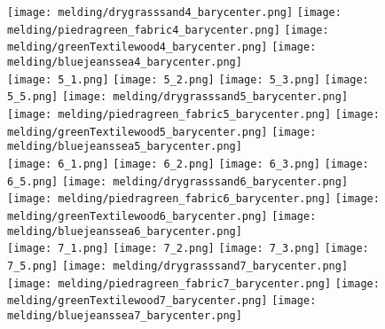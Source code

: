 \begin{figure}[ht!]
{    \hspace{2mm}
    \texttt{[image: melding/drygrasssand4\_barycenter.png]}
    \texttt{[image: melding/piedragreen\_fabric4\_barycenter.png]}
    \texttt{[image: melding/greenTextilewood4\_barycenter.png]}
    \texttt{[image: melding/bluejeanssea4\_barycenter.png]}
 \\
\vspace{1mm}
    \texttt{[image: 5\_1.png]}
    \texttt{[image: 5\_2.png]}
    \texttt{[image: 5\_3.png]}
    \texttt{[image: 5\_5.png]}
    \hspace{2mm}
    \texttt{[image: melding/drygrasssand5\_barycenter.png]}
    \texttt{[image: melding/piedragreen\_fabric5\_barycenter.png]}
    \texttt{[image: melding/greenTextilewood5\_barycenter.png]}
    \texttt{[image: melding/bluejeanssea5\_barycenter.png]}
 \\
\vspace{1mm}
    \texttt{[image: 6\_1.png]}
    \texttt{[image: 6\_2.png]}
    \texttt{[image: 6\_3.png]}
    \texttt{[image: 6\_5.png]}
    \hspace{2mm}
    \texttt{[image: melding/drygrasssand6\_barycenter.png]}
    \texttt{[image: melding/piedragreen\_fabric6\_barycenter.png]}
    \texttt{[image: melding/greenTextilewood6\_barycenter.png]}
    \texttt{[image: melding/bluejeanssea6\_barycenter.png]}
 \\
\vspace{1mm}
    \texttt{[image: 7\_1.png]}
    \texttt{[image: 7\_2.png]}
    \texttt{[image: 7\_3.png]}
    \texttt{[image: 7\_5.png]}
    \hspace{2mm}
    \texttt{[image: melding/drygrasssand7\_barycenter.png]}
    \texttt{[image: melding/piedragreen\_fabric7\_barycenter.png]}
    \texttt{[image: melding/greenTextilewood7\_barycenter.png]}
    \texttt{[image: melding/bluejeanssea7\_barycenter.png]}
}
\end{figure}
